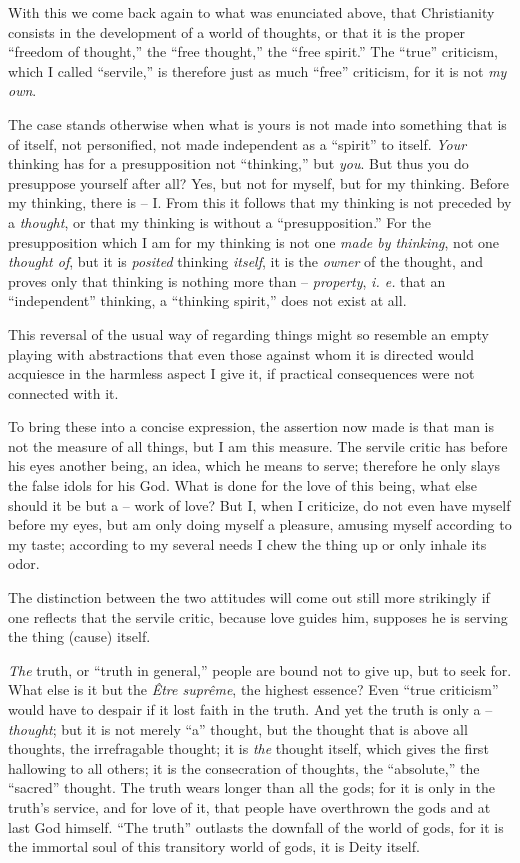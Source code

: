\documentclass[12pt,a4paper]{book}
\begin{document}
With this we come back again to what was enunciated above, that Christianity 
consists in the development of a world of thoughts, or that it is the proper 
``freedom of thought,'' the ``free thought,'' the ``free spirit.'' The 
``true'' criticism, which I called ``servile,'' is therefore just as much 
``free'' criticism, for it is not \textit{my own}.

The case stands otherwise when what is yours is not made into something that 
is of itself, not personified, not made independent as a ``spirit'' to 
itself. \textit{Your} thinking has for a presupposition not ``thinking,'' 
but \textit{you}. But thus you do presuppose yourself after all? Yes, but not 
for myself, but for my thinking. Before my thinking, there is -- I. From this 
it follows that my thinking is not preceded by a \textit{thought}, or that my 
thinking is without a ``presupposition.'' For the presupposition which I am 
for my thinking is not one \textit{made by thinking}, not one \textit{thought 
of}, but it is \textit{posited} thinking \textit{itself}, it is the 
\textit{owner} of the thought, and proves only that thinking is nothing more 
than -- \textit{property}, \textit{i. e.} that an ``independent'' thinking, 
a ``thinking spirit,'' does not exist at all.

 This reversal of the usual way of regarding things might so resemble an empty 
playing with abstractions that even those against whom it is directed would 
acquiesce in the harmless aspect I give it, if practical consequences were not 
connected with it.

To bring these into a concise expression, the assertion now made is that man 
is not the measure of all things, but I am this measure. The servile critic 
has before his eyes another being, an idea, which he means to serve; therefore 
he only slays the false idols for his God. What is done for the love of this 
being, what else should it be but a -- work of love? But I, when I criticize, 
do not even have myself before my eyes, but am only doing myself a pleasure, 
amusing myself according to my taste; according to my several needs I chew the 
thing up or only inhale its odor.

The distinction between the two attitudes will come out still more strikingly 
if one reflects that the servile critic, because love guides him, supposes he 
is serving the thing (cause) itself.

\textit{The} truth, or ``truth in general,'' people are bound not to give 
up, but to seek for. What else is it but the \textit{\^Etre supr\^eme}, the 
highest essence? Even ``true criticism'' would have to despair if it lost 
faith in the truth. And yet the truth is only a -- \textit{thought}; but it is 
not merely ``a'' thought, but the thought that is above all thoughts, the 
irrefragable thought; it is \textit{the} thought itself, which gives the first 
hallowing to all others; it is the consecration of thoughts, the 
``absolute,'' the ``sacred'' thought. The truth wears longer than all the 
gods; for it is only in the truth's service, and for love of it, that people 
have overthrown the gods and at last God himself. ``The truth'' outlasts the 
downfall of the world of gods, for it is the immortal soul of this transitory 
world of gods, it is Deity itself.
\end{document}

